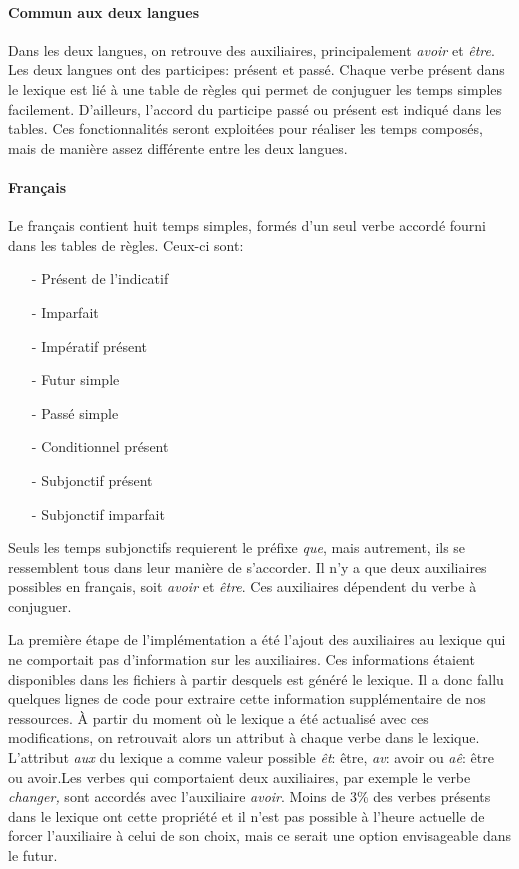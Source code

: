 \documentclass[11pt]{article} %
\begin{document}
\paragraph{Commun aux deux langues}

Dans les deux langues, on retrouve des auxiliaires, principalement 
\emph{avoir} et \emph{être}. Les deux langues ont des participes: 
présent et passé. Chaque verbe présent dans le lexique est 
lié à une table de règles qui 
permet de conjuguer les temps simples facilement. D'ailleurs, l'accord 
du participe passé ou présent est indiqué dans les tables. Ces fonctionnalités 
seront exploitées pour réaliser les temps composés, mais de manière assez 
différente entre les deux langues.

\paragraph{Français}

Le français contient huit temps simples, formés d'un seul verbe accordé fourni
dans les tables de règles. Ceux-ci sont:
\begin{itemize}
\item[-] Présent de l'indicatif
\item[-] Imparfait
\item[-] Impératif présent
\item[-] Futur simple
\item[-] Passé simple
\item[-] Conditionnel présent
\item[-] Subjonctif présent
\item[-] Subjonctif imparfait
\end{itemize}
Seuls les temps subjonctifs requierent le préfixe \emph{que}, 
mais autrement, ils se ressemblent tous dans leur manière de s'accorder. Il n'y 
a que deux auxiliaires possibles en français, soit \emph{avoir} et \emph{être}.
Ces auxiliaires dépendent du verbe à conjuguer.

La première étape de l'implémentation
a été l'ajout des auxiliaires au lexique qui ne comportait pas
d'information sur les auxiliaires. Ces informations
étaient disponibles dans les fichiers à partir desquels est généré
le lexique. Il a donc fallu quelques lignes de code pour extraire
cette information supplémentaire de nos ressources. À partir du moment
où le lexique a été actualisé avec ces modifications, on retrouvait
alors un attribut à chaque verbe dans le lexique. L'attribut \emph{aux
}du lexique a comme valeur possible \emph{êt}: être, \emph{av}: avoir
ou \emph{aê}: être ou avoir.Les verbes qui comportaient
deux auxiliaires, par exemple le verbe \emph{changer,} sont accordés
avec l'auxiliaire \emph{avoir}. Moins de 3\% des verbes présents dans le
lexique ont cette propriété et il n'est pas possible à l'heure actuelle
de forcer l'auxiliaire à celui de son choix, mais ce serait une option
envisageable dans le futur. 
\end{document}
